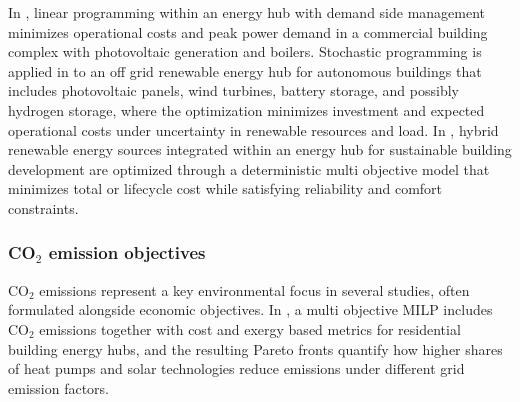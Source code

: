 \documentclass[12pt,a4paper]{report}
\begin{document}
In \cite{batic2016combined}, linear programming within an energy hub with demand side management minimizes operational costs and peak power demand in a commercial building complex with photovoltaic generation and boilers. Stochastic programming is applied in \cite{hemmati2019stochastic} to an off grid renewable energy hub for autonomous buildings that includes photovoltaic panels, wind turbines, battery storage, and possibly hydrogen storage, where the optimization minimizes investment and expected operational costs under uncertainty in renewable resources and load. In \cite{xu2018designoptimization}, hybrid renewable energy sources integrated within an energy hub for sustainable building development are optimized through a deterministic multi objective model that minimizes total or lifecycle cost while satisfying reliability and comfort constraints. %


\subsubsection{CO$_2$ emission objectives}

CO$_2$ emissions represent a key environmental focus in several studies, often formulated alongside economic objectives. In \cite{tonellato2021optimaldesign}, a multi objective MILP includes CO$_2$ emissions together with cost and exergy based metrics for residential building energy hubs, and the resulting Pareto fronts quantify how higher shares of heat pumps and solar technologies reduce emissions under different grid emission factors. %
\end{document}
